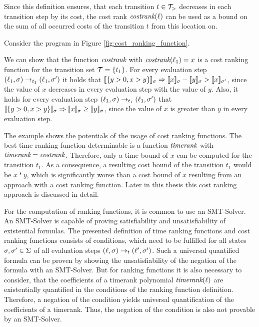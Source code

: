Since this definition ensures, that each transition $t \in \mathcal{T}_>$ decreases in each transition step by its cost, the cost rank $\emph{costrank}(\ell)$ can be used as a bound on the sum of all occurred costs of the transition $t$ from this location on.

\begin{example}
  Consider the program in Figure \ref{fig:cost_ranking_function}.
  
  We can show that the function $\emph{costrank}$ with $\emph{costrank}(\ell_1) = x$ is a cost ranking function for the transition set $\mathcal{T} = \lbrace t_1 \rbrace$.
  For every evaluation step $(\ell_1,\sigma) \rightarrow_{t_1} (\ell_1,\sigma')$ it holds that $\llbracket \lbrace y > 0, x > y \rbrace \rrbracket_{\sigma} \Rightarrow \llbracket x \rrbracket_{\sigma} - \llbracket y \rrbracket_{\sigma} > \llbracket x \rrbracket_{\sigma'}$, since the value of $x$ decreases in every evaluation step with the value of $y$.
  Also, it holds for every evaluation step $(\ell_1,\sigma) \rightarrow_{t_1} (\ell_1,\sigma')$ that $\llbracket \lbrace y > 0, x > y \rbrace \rrbracket_{\sigma} \Rightarrow \llbracket x \rrbracket_{\sigma} \geq \llbracket y \rrbracket_{\sigma}$, since the value of $x$ is greater than $y$ in every evaluation step.
\end{example}

The example shows the potentials of the usage of cost ranking functions.
The best time ranking function determinable is a function $\emph{timerank}$ with $\emph{timerank} = \emph{costrank}$.
Therefore, only a time bound of $x$ can be computed for the transition $t_1$.
As a consequence, a resulting cost bound of the transition $t_1$ would be $x*y$, which is significantly worse than a cost bound of $x$ resulting from an approach with a cost ranking function.
Later in this thesis this cost ranking approach is discussed in detail.

For the computation of ranking functions, it is common to use an SMT-Solver.
An SMT-Solver is capable of proving satisfiability and unsatisfiability of existential formulas.
The presented definition of time ranking functions and cost ranking functions consists of conditions, which need to be fulfilled for all states $\sigma, \sigma' \in \Sigma$ of all evaluation steps $(\ell, \sigma) \rightarrow_t (\ell', \sigma')$.
Such a universal quantified formula can be proven by showing the unsatisfiability of the negation of the formula with an SMT-Solver.
But for ranking functions it is also necessary to consider, that the coefficients of a timerank polynomial $\emph{timerank}(\ell)$ are existentially quantified in the conditions of the ranking function definition.
Therefore, a negation of the condition yields universal quantification of the coefficients of a timerank.
Thus, the negation of the condition is also not provable by an SMT-Solver.


